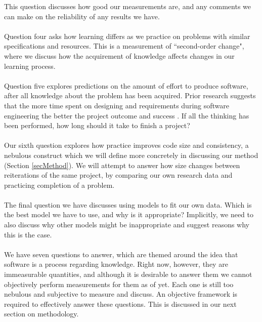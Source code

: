This question discusses how good our measurements are, and any comments we can
make on the reliability of any results we have.\\
\\
Question four asks how learning differs as we practice on problems with similar
specifications and resources.
This is a measurement of ``second-order change", where we discuss how the
acquirement of knowledge affects changes in our learning process.\\
\\
Question five explores predictions on the amount of effort to produce software,
after all knowledge about the problem has been acquired.
Prior research suggests that the more time spent on designing and requirements during software
engineering the better the project outcome and success \cite{glass1998software,boehm1975some}.
If all the thinking has been performed, how long should it take to
finish a project?\\
\\
Our sixth question explores how practice improves code size and consistency, a nebulous
construct which we will define more concretely in discussing our method (Section
\ref{secMethod}).
We will attempt to answer how size changes between reiterations of the same
project, by comparing our own research data and practicing completion of a
problem.\\
\\
The final question we have discusses using models to fit our own data.
Which is the best model we have to use, and why is it appropriate?
Implicitly, we need to also discuss why other models might be inappropriate and
suggest reasons why this is the case.\\
\\
We have seven questions to answer, which are themed around the idea that
software is a process regarding knowledge.
Right now, however, they are immeasurable quantities, and although it is
desirable to answer them we cannot objectively perform measurements for them
as of yet.
Each one is still too nebulous and subjective to measure and discuss.
An objective framework is required to effectively answer these questions.
This is discussed in our next section on methodology.
